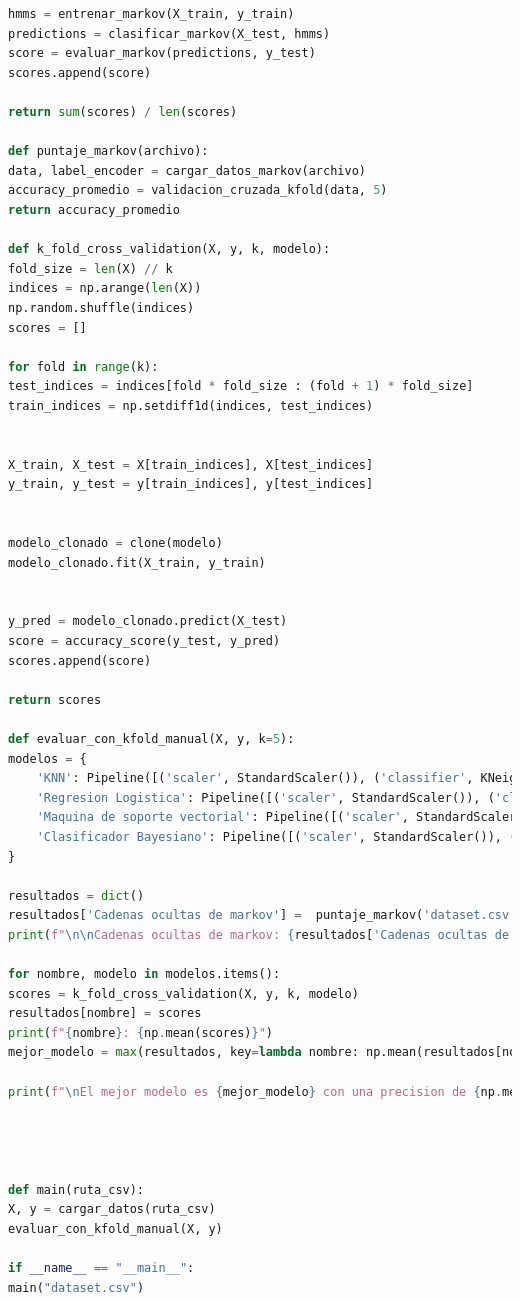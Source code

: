 \documentclass[12pt]{article}
\begin{document}
\begin{lstlisting}[language=Python]
hmms = entrenar_markov(X_train, y_train)
predictions = clasificar_markov(X_test, hmms)
score = evaluar_markov(predictions, y_test)
scores.append(score)

return sum(scores) / len(scores)

def puntaje_markov(archivo):
data, label_encoder = cargar_datos_markov(archivo)
accuracy_promedio = validacion_cruzada_kfold(data, 5)
return accuracy_promedio

def k_fold_cross_validation(X, y, k, modelo):
fold_size = len(X) // k
indices = np.arange(len(X))
np.random.shuffle(indices)
scores = []

for fold in range(k):
test_indices = indices[fold * fold_size : (fold + 1) * fold_size]
train_indices = np.setdiff1d(indices, test_indices)


X_train, X_test = X[train_indices], X[test_indices]
y_train, y_test = y[train_indices], y[test_indices]


modelo_clonado = clone(modelo)
modelo_clonado.fit(X_train, y_train)


y_pred = modelo_clonado.predict(X_test)
score = accuracy_score(y_test, y_pred)
scores.append(score)

return scores

def evaluar_con_kfold_manual(X, y, k=5):
modelos = {
	'KNN': Pipeline([('scaler', StandardScaler()), ('classifier', KNeighborsClassifier(n_neighbors=5))]),
	'Regresion Logistica': Pipeline([('scaler', StandardScaler()), ('classifier', LogisticRegression(random_state=42))]),
	'Maquina de soporte vectorial': Pipeline([('scaler', StandardScaler()), ('classifier', SVC(kernel='linear', random_state=42))]),
	'Clasificador Bayesiano': Pipeline([('scaler', StandardScaler()), ('classifier', GaussianNB())])
}

resultados = dict()
resultados['Cadenas ocultas de markov'] =  puntaje_markov('dataset.csv')
print(f"\n\nCadenas ocultas de markov: {resultados['Cadenas ocultas de markov']}")

for nombre, modelo in modelos.items():
scores = k_fold_cross_validation(X, y, k, modelo)
resultados[nombre] = scores
print(f"{nombre}: {np.mean(scores)}")
mejor_modelo = max(resultados, key=lambda nombre: np.mean(resultados[nombre]))

print(f"\nEl mejor modelo es {mejor_modelo} con una precision de {np.mean(resultados[mejor_modelo])}.")




def main(ruta_csv):
X, y = cargar_datos(ruta_csv)
evaluar_con_kfold_manual(X, y)

if __name__ == "__main__":
main("dataset.csv")




\end{lstlisting}
\end{document}

